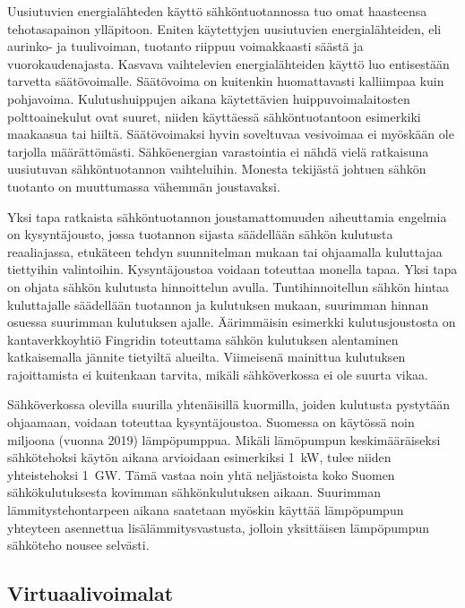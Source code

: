   Uusiutuvien energialähteden käyttö sähköntuotannossa tuo omat haasteensa tehotasapainon ylläpitoon. Eniten käytettyjen uusiutuvien energialähteiden, eli aurinko- ja tuulivoiman, tuotanto riippuu voimakkaasti säästä ja vuorokaudenajasta. Kasvava vaihtelevien energialähteiden käyttö luo entisestään tarvetta säätövoimalle.\parencite{energiateollisuus} Säätövoima on kuitenkin huomattavasti kalliimpaa kuin pohjavoima. Kulutushuippujen aikana käytettävien huippuvoimalaitosten polttoainekulut ovat suuret, niiden käyttäessä sähköntuotantoon esimerkiki maakaasua tai hiiltä. Säätövoimaksi hyvin soveltuvaa vesivoimaa ei myöskään ole tarjolla määrättömästi. Sähköenergian varastointia ei nähdä vielä ratkaisuna uusiutuvan sähköntuotannon vaihteluihin. Monesta tekijästä johtuen sähkön tuotanto on muuttumassa vähemmän joustavaksi.

  Yksi tapa ratkaista sähköntuotannon joustamattomuuden aiheuttamia engelmia on kysyntäjousto, jossa tuotannon sijasta säädellään sähkön kulutusta reaaliajassa, etukäteen tehdyn suunnitelman mukaan tai ohjaamalla kuluttajaa tiettyihin valintoihin. Kysyntäjoustoa voidaan toteuttaa monella tapaa.\parencite{fingrid} Yksi tapa on ohjata sähkön kulutusta hinnoittelun avulla. Tuntihinnoitellun sähkön hintaa kuluttajalle säädellään tuotannon ja kulutuksen mukaan, suurimman hinnan osuessa suurimman kulutuksen ajalle. Äärimmäisin esimerkki kulutusjoustosta on kantaverkkoyhtiö Fingridin toteuttama sähkön kulutuksen alentaminen katkaisemalla jännite tietyiltä alueilta. Viimeisenä mainittua kulutuksen rajoittamista ei kuitenkaan tarvita, mikäli sähköverkossa ei ole suurta vikaa.

  Sähköverkossa olevilla suurilla yhtenäisillä kuormilla, joiden kulutusta pystytään ohjaamaan, voidaan toteuttaa kysyntäjoustoa\parencite{fingrid}. Suomessa on käytössä noin miljoona (vuonna 2019) lämpöpumppua\parencite{sulpu}. Mikäli lämöpumpun keskimääräiseksi sähkötehoksi käytön aikana arvioidaan esimerkiksi \SI{1}{\kilo\watt}, tulee niiden yhteistehoksi \SI{1}{\giga\watt}. Tämä vastaa noin yhtä neljästoista koko Suomen sähkökulutuksesta kovimman sähkönkulutuksen aikaan. Suurimman lämmitystehontarpeen aikana saatetaan myöskin käyttää lämpöpumpun yhteyteen asennettua lisälämmitysvastusta, jolloin yksittäisen lämpöpumpun sähköteho nousee selvästi.

\subsection{Virtuaalivoimalat}


